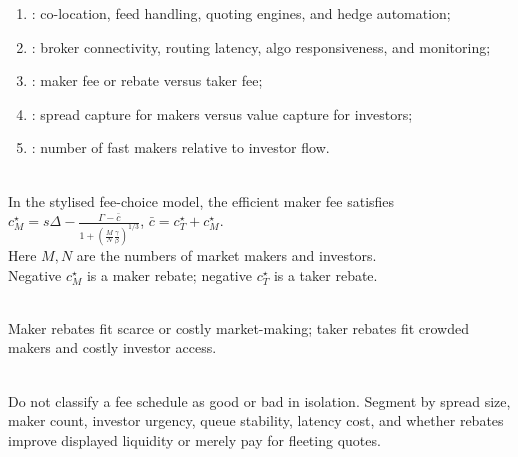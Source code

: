 \begin{taxonomy} 
\begin{enumerate}[label=\roman*.]
\setlength{\itemsep}{0pt}
\item {}: co-location, feed handling, quoting engines, and hedge automation;
\item {}: broker connectivity, routing latency, algo responsiveness, and monitoring;
\item {}: maker fee or rebate versus taker fee;
\item {}: spread capture for makers versus value capture for investors;
\item {}: number of fast makers relative to investor flow.
\end{enumerate}
\end{taxonomy}

\begin{definition} \\
In the stylised fee-choice model, the efficient maker fee satisfies $c_M^\star=s\Delta-\frac{\Gamma-\bar{c}}{1+\left(\frac{M}{N}\frac{\gamma}{\beta}\right)^{1/3}}$, $\bar{c}=c_T^\star+c_M^\star$.\\
Here $M,N$ are the numbers of market makers and investors.\\
Negative $c_M^\star$ is a maker rebate; negative $c_T^\star$ is a taker rebate.
\end{definition}

\begin{caveat} \\
Maker rebates fit scarce or costly market-making; taker rebates fit crowded makers and costly investor access.
\end{caveat}

\begin{practitionernote} \\
Do not classify a fee schedule as good or bad in isolation. Segment by spread size, maker count, investor urgency, queue stability, latency cost, and whether rebates improve displayed liquidity or merely pay for fleeting quotes.
\end{practitionernote}
